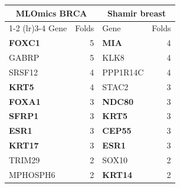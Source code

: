 \begin{tabular}{lrlr}
\toprule
\multicolumn{2}{c}{MLOmics BRCA} & \multicolumn{2}{c}{Shamir breast} \\
\cmidrule(lr){1-2} \cmidrule(lr){3-4}
Gene & Folds & Gene & Folds \\
\midrule
\textbf{FOXC1} & 5 & \textbf{MIA} & 4 \\
GABRP & 5 & KLK8 & 4 \\
SRSF12 & 4 & PPP1R14C & 4 \\
\textbf{KRT5} & 4 & STAC2 & 3 \\
\textbf{FOXA1} & 3 & \textbf{NDC80} & 3 \\
\textbf{SFRP1} & 3 & \textbf{KRT5} & 3 \\
\textbf{ESR1} & 3 & \textbf{CEP55} & 3 \\
\textbf{KRT17} & 3 & \textbf{ESR1} & 3 \\
TRIM29 & 2 & SOX10 & 2 \\
MPHOSPH6 & 2 & \textbf{KRT14} & 2 \\
\bottomrule
\end{tabular}
